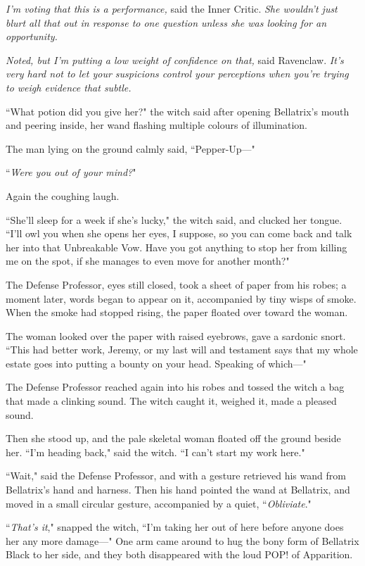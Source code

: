 \emph{I'm voting that this is a performance,} said the Inner Critic. \emph{She wouldn't just blurt all that out in response to one question unless she was looking for an opportunity.}

\emph{Noted, but I'm putting a low weight of confidence on that,} said Ravenclaw. \emph{It's very hard not to let your suspicions control your perceptions when you're trying to weigh evidence that subtle.}

``What potion did you give her?" the witch said after opening Bellatrix's mouth and peering inside, her wand flashing multiple colours of illumination.

The man lying on the ground calmly said, ``Pepper-Up—"

``\emph{Were you out of your mind?}"

Again the coughing laugh.

``She'll sleep for a week if she's lucky," the witch said, and clucked her tongue. ``I'll owl you when she opens her eyes, I suppose, so you can come back and talk her into that Unbreakable Vow. Have you got anything to stop her from killing me on the spot, if she manages to even move for another month?"

The Defense Professor, eyes still closed, took a sheet of paper from his robes; a moment later, words began to appear on it, accompanied by tiny wisps of smoke. When the smoke had stopped rising, the paper floated over toward the woman.

The woman looked over the paper with raised eyebrows, gave a sardonic snort. ``This had better work, Jeremy, or my last will and testament says that my whole estate goes into putting a bounty on your head. Speaking of which—"

The Defense Professor reached again into his robes and tossed the witch a bag that made a clinking sound. The witch caught it, weighed it, made a pleased sound.

Then she stood up, and the pale skeletal woman floated off the ground beside her. ``I'm heading back," said the witch. ``I can't start my work here."

``Wait," said the Defense Professor, and with a gesture retrieved his wand from Bellatrix's hand and harness. Then his hand pointed the wand at Bellatrix, and moved in a small circular gesture, accompanied by a quiet, ``\emph{Obliviate}."

``\emph{That's it}," snapped the witch, ``I'm taking her out of here before anyone does her any more damage—" One arm came around to hug the bony form of Bellatrix Black to her side, and they both disappeared with the loud POP! of Apparition.

